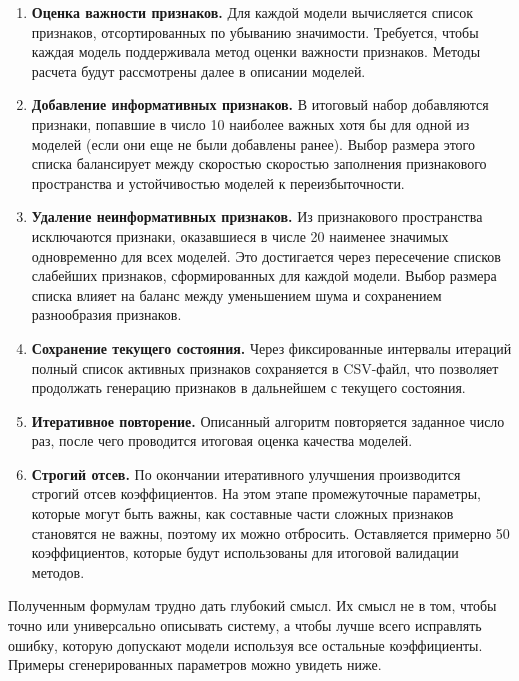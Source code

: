 \documentclass[a4paper,12pt]{article}
\begin{document}
\begin{enumerate}
      \item \textbf{Оценка важности признаков.}
      Для каждой модели вычисляется список признаков, отсортированных по убыванию значимости. Требуется, чтобы каждая модель поддерживала метод оценки важности признаков. Методы расчета будут рассмотрены далее в описании моделей.
      
      \item \textbf{Добавление информативных признаков.}
      В итоговый набор добавляются признаки, попавшие в число 10 наиболее важных хотя бы для одной из моделей (если они еще не были добавлены ранее). Выбор размера этого списка балансирует между скоростью скоростью заполнения признакового пространства и устойчивостью моделей к переизбыточности.
      
      \item \textbf{Удаление неинформативных признаков.}
      Из признакового пространства исключаются признаки, оказавшиеся в числе 20 наименее значимых одновременно для всех моделей. Это достигается через пересечение списков слабейших признаков, сформированных для каждой модели. Выбор размера списка влияет на баланс между уменьшением шума и сохранением разнообразия признаков.
      
      \item \textbf{Сохранение текущего состояния.}
      Через фиксированные интервалы итераций полный список активных признаков сохраняется в CSV-файл, что позволяет продолжать генерацию признаков в дальнейшем с текущего состояния.
      
      \item \textbf{Итеративное повторение.}
      Описанный алгоритм повторяется заданное число раз, после чего проводится итоговая оценка качества моделей.

      \item \textbf{Строгий отсев.}
      По окончании итеративного улучшения производится строгий отсев коэффициентов. На этом этапе промежуточные параметры, которые могут быть важны, как составные части сложных признаков становятся не важны, поэтому их можно отбросить. Оставляется примерно 50 коэффициентов, которые будут использованы для итоговой валидации методов.
    \end{enumerate}
    
    Полученным формулам трудно дать глубокий смысл. Их смысл не в том, чтобы точно или универсально описывать систему, а чтобы лучше всего исправлять ошибку, которую допускают модели используя все остальные коэффициенты. Примеры сгенерированных параметров можно увидеть ниже.
\end{document}
